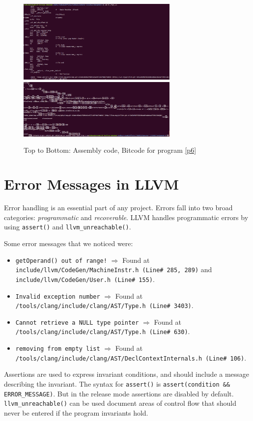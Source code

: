 \documentclass{article}
\begin{document}
\begin{figure}[H]
\centering
\includegraphics[width=0.7\textwidth]{./images/NT_1_ASM.png}
\includegraphics[width=0.7\textwidth]{./images/NT_1_BC.png}
\caption{Top to Bottom: Assembly code, Bitcode for program \ref{p6}}
\end{figure}

\section{Error Messages in LLVM}
\begin{flushleft}
Error handling is an essential part of any project. Errors fall into two broad categories: \textit{programmatic} and \textit{recoverable}. LLVM handles programmatic errors by using \texttt{assert()} and \texttt{llvm\_unreachable()}. 

Some error messages that we noticed were:
\begin{itemize}
\item \texttt{getOperand() out of range!} \(\Rightarrow\) Found at \texttt{include/llvm/CodeGen/MachineInstr.h (Line\# 285, 289)} and \texttt{include/llvm/CodeGen/User.h (Line\# 155)}.
\item \texttt{Invalid exception number} \(\Rightarrow\) Found at \texttt{/tools/clang/include/clang/AST/Type.h (Line\# 3403)}.
\item \texttt{Cannot retrieve a NULL type pointer} \(\Rightarrow\) Found at \texttt{/tools/clang/include/clang/AST/Type.h (Line\# 630)}.
\item \texttt{removing from empty list} \(\Rightarrow\) Found at \texttt{/tools/clang/include/clang/AST/DeclContextInternals.h (Line\# 106)}.
\end{itemize}

Assertions are used to express invariant conditions, and should include a message describing the invariant. The syntax for \texttt{assert()} is \texttt{assert(condition \&\& ERROR\_MESSAGE)}. But in the release mode assertions are disabled by default. \texttt{llvm\_unreachable()} can be used document areas of control flow that should never be entered if the program invariants hold.
\end{flushleft}
\end{document}

